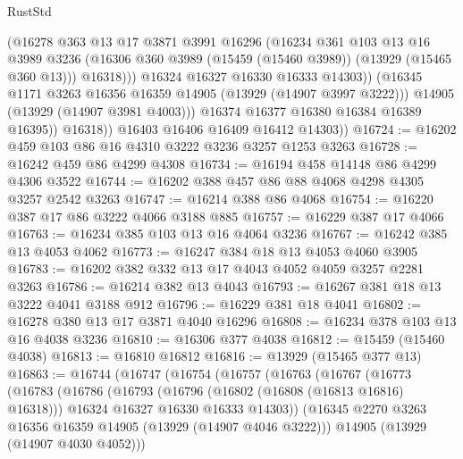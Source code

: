 \begin{lexlean}{RustStd}
\begin{coremodule}
                        (@16278
                          @363
                          @13
                          @17
                          @3871
                          @3991
                          @16296
                          (@16234
                            @361
                            @103
                            @13
                            @16
                            @3989
                            @3236
                            (@16306 @360 @3989 (@15459 (@15460 @3989)) (@13929 (@15465 @360 @13)))
                            @16318)))
                      @16324
                      @16327
                      @16330
                      @16333
                      @14303))
                  (@16345 @1171 @3263 @16356 @16359 @14905 (@13929 (@14907 @3997 @3222)))
                  @14905
                  (@13929 (@14907 @3981 @4003)))
                @16374
                @16377
                @16380
                @16384
                @16389
                @16395))
            @16318))
        @16403
        @16406
        @16409
        @16412
        @14303))
@16724 := @16202 @459 @103 @86 @16 @4310 @3222 @3236 @3257 @1253 @3263
@16728 := @16242 @459 @86 @4299 @4308
@16734 := @16194 @458 @14148 @86 @4299 @4306 @3522
@16744 := @16202 @388 @457 @86 @88 @4068 @4298 @4305 @3257 @2542 @3263
@16747 := @16214 @388 @86 @4068
@16754 := @16220 @387 @17 @86 @3222 @4066 @3188 @885
@16757 := @16229 @387 @17 @4066
@16763 := @16234 @385 @103 @13 @16 @4064 @3236
@16767 := @16242 @385 @13 @4053 @4062
@16773 := @16247 @384 @18 @13 @4053 @4060 @3905
@16783 := @16202 @382 @332 @13 @17 @4043 @4052 @4059 @3257 @2281 @3263
@16786 := @16214 @382 @13 @4043
@16793 := @16267 @381 @18 @13 @3222 @4041 @3188 @912
@16796 := @16229 @381 @18 @4041
@16802 := @16278 @380 @13 @17 @3871 @4040 @16296
@16808 := @16234 @378 @103 @13 @16 @4038 @3236
@16810 := @16306 @377 @4038
@16812 := @15459 (@15460 @4038)
@16813 := @16810 @16812
@16816 := @13929 (@15465 @377 @13)
@16863 := @16744
    (@16747
      (@16754
        (@16757
          (@16763
            (@16767
              (@16773
                (@16783
                  (@16786
                    (@16793
                      (@16796 (@16802 (@16808 (@16813 @16816) @16318)))
                      @16324
                      @16327
                      @16330
                      @16333
                      @14303))
                  (@16345 @2270 @3263 @16356 @16359 @14905 (@13929 (@14907 @4046 @3222)))
                  @14905
                  (@13929 (@14907 @4030 @4052)))

\end{coremodule}
\end{lexlean}
